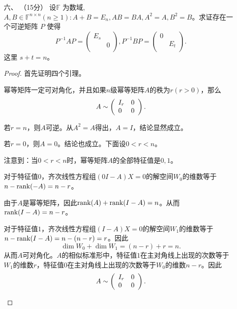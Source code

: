 \begin{enumerate}[1~]
\item[六、]（15分）
设$\mathbb{F}$ 为数域, $A , B \in \mathbb { F } ^ { n 
\times n } ( n \geq 1 ) : A + B = E _ { n } , A B = B A , A ^ 
{ 2 } = A , B ^ { 2 } = B$。求证存在一个可逆矩阵 $P$ 使得\[
P ^ { - 1 } A P = \left( \begin{matrix}
	E_s&		\\
	&		0\\
\end{matrix} \right)  , 
P ^ { - 1 } B P = \left( \begin{matrix}
	0&		\\
	&		E_t\\
\end{matrix} \right) .
\]
这里 $s + t = n$。
\begin{proof}
首先证明四个引理。
\begin{lemma}
幂等矩阵一定可对角化，并且如果$n$级幂等矩阵$A$的秩为$r (r>0)$，那么\[
A \sim \left( \begin{array} { l l } { I _ { r } } & { 0 } \\ { 0 } & { 0 } \end{array} \right).
\]
\end{lemma}
\begin{subproof}
若$r=n$，则$A$可逆。从$A^2=A$得出，$A=I$，结论显然成立。

若$r=0$，则$A=0$。结论也成立。下面设$0<r<n$。

注意到：当$0<r<n$时，幂等矩阵$A$的全部特征值是$0, 1$。

对于特征值$0$，齐次线性方程组$(0I-A)X=0$的解空间$W_0$的维数等于$n-{\rm rank}(-A)=n-r$。

由于$A$是幂等矩阵，因此${\rm rank}(A)+{\rm rank}(I-A)=n$。从而${\rm rank}(I-A)=n-r$。

对于特征值$1$，齐次线性方程组$(I-A)X=0$的解空间$W_1$的维数等于$n-{\rm rank}(I-A)=n-(n-r)=r$。因此\[
\operatorname { dim } W _ { 0 } + \operatorname { dim } W _ { 1 } = ( n - r ) + r = n.
\]
从而$A$可对角化。$A$的相似标准形中，特征值$1$在主对角线上出现的次数等于$W_1$的维数$r$，特征值$0$在主对角线上出现的次数等于$W_0$的维数$n-r$。因此\[
A \sim \left( \begin{array} { l l } { I _ { r } } & { 0 } \\ { 0 } & { 0 } \end{array} \right).
\]
\end{subproof}


\end{proof}
\end{enumerate}
